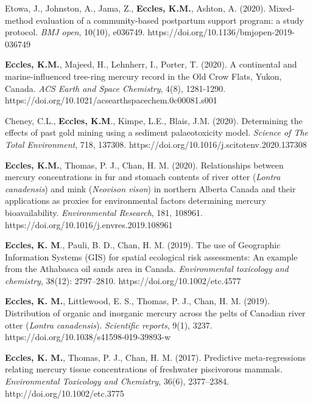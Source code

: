 \documentclass[margin,line]{res}
\begin{document}
\begin{resume}
\begin{etaremune}[start=25]
\item Etowa, J., Johnston, A., Jama, Z., \textbf{Eccles, K.M.}, Ashton, A. (2020). Mixed-method evaluation of a community-based postpartum support program: a study protocol. \textit{BMJ open}, 10(10), e036749. https://doi.org/10.1136/bmjopen-2019-036749

\item \textbf{Eccles, K.M.}, Majeed, H., Lehnherr, I., Porter, T. (2020). A continental and marine-influenced tree-ring mercury record in the Old Crow Flats, Yukon, Canada. \textit{ACS Earth and Space Chemistry}, 4(8), 1281-1290. https://doi.org/10.1021/acsearthspacechem.0c00081.s001

\item Cheney, C.L., \textbf{Eccles, K.M}., Kimpe, L.E., Blais, J.M. (2020). Determining the effects of past gold mining using a sediment palaeotoxicity model. \textit{Science of The Total Environment}, 718, 137308. https://doi.org/10.1016/j.scitotenv.2020.137308

\item \textbf{Eccles, K.M.}, Thomas, P. J., Chan, H. M. (2020). Relationships between mercury concentrations in fur and stomach contents of river otter (\textit{Lontra canadensis}) and mink (\textit{Neovison vison}) in northern Alberta Canada and their applications as proxies for environmental factors determining mercury bioavailability. \textit{Environmental Research}, 181, 108961. https://doi.org/10.1016/j.envres.2019.108961

\item \textbf{Eccles, K. M}., Pauli, B. D., Chan, H. M. (2019). The use of Geographic Information Systems (GIS) for spatial ecological risk assessments: An example from the Athabasca oil sands area in Canada. \textit{Environmental toxicology and chemistry}, 38(12): 2797–2810. https://doi.org/10.1002/etc.4577

\item \textbf{Eccles, K. M.}, Littlewood, E. S., Thomas, P. J., Chan, H. M. (2019). Distribution of organic and inorganic mercury across the pelts of Canadian river otter (\textit{Lontra canadensis}). \textit{Scientific reports}, 9(1), 3237. https://doi.org/10.1038/s41598-019-39893-w

\item \textbf{Eccles, K. M.}, Thomas, P. J., Chan, H. M. (2017). Predictive meta-regressions relating mercury tissue concentrations of freshwater piscivorous mammals. \textit{Environmental Toxicology and Chemistry}, 36(6), 2377–2384. http://doi.org/10.1002/etc.3775


\end{etaremune}
\end{resume}
\end{document}
